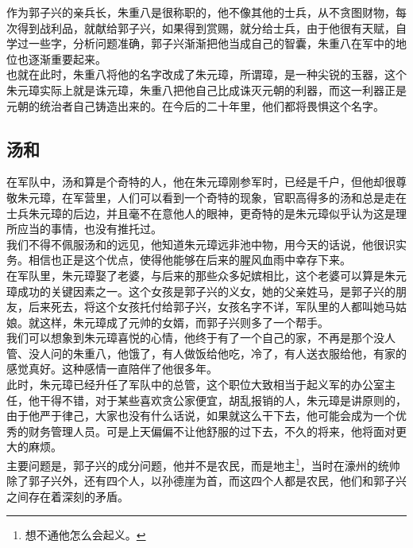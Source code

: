 \begin{multicols}{\theparacolNo}
作为郭子兴的亲兵长，朱重八是很称职的，他不像其他的士兵，从不贪图财物，每次得到战利品，就献给郭子兴，如果得到赏赐，就分给士兵，由于他很有天赋，自学过一些字，分析问题准确，郭子兴渐渐把他当成自己的智囊，朱重八在军中的地位也逐渐重要起来。\\

也就在此时，朱重八将他的名字改成了朱元璋，所谓璋，是一种尖锐的玉器，这个朱元璋实际上就是诛元璋，朱重八把他自己比成诛灭元朝的利器，而这一利器正是元朝的统治者自己铸造出来的。在今后的二十年里，他们都将畏惧这个名字。\\

\subsection{汤和}
在军队中，汤和算是个奇特的人，他在朱元璋刚参军时，已经是千户，但他却很尊敬朱元璋，在军营里，人们可以看到一个奇特的现象，官职高得多的汤和总是走在士兵朱元璋的后边，并且毫不在意他人的眼神，更奇特的是朱元璋似乎认为这是理所应当的事情，也没有推托过。\\

我们不得不佩服汤和的远见，他知道朱元璋远非池中物，用今天的话说，他很识实务。相信也正是这个优点，使得他能够在后来的腥风血雨中幸存下来。\\

在军队里，朱元璋娶了老婆，与后来的那些众多妃嫔相比，这个老婆可以算是朱元璋成功的关键因素之一。这个女孩是郭子兴的义女，她的父亲姓马，是郭子兴的朋友，后来死去，将这个女孩托付给郭子兴，女孩名字不详，军队里的人都叫她马姑娘。就这样，朱元璋成了元帅的女婿，而郭子兴则多了一个帮手。\\

我们可以想象到朱元璋喜悦的心情，他终于有了一个自己的家，不再是那个没人管、没人问的朱重八，他饿了，有人做饭给他吃，冷了，有人送衣服给他，有家的感觉真好。这种感情一直陪伴了他很多年。\\

此时，朱元璋已经升任了军队中的总管，这个职位大致相当于起义军的办公室主任，他干得不错，对于某些喜欢贪公家便宜，胡乱报销的人，朱元璋是讲原则的，由于他严于律己，大家也没有什么话说，如果就这么干下去，他可能会成为一个优秀的财务管理人员。可是上天偏偏不让他舒服的过下去，不久的将来，他将面对更大的麻烦。\\

主要问题是，郭子兴的成分问题，他并不是农民，而是地主\footnote{想不通他怎么会起义。}，当时在濠州的统帅除了郭子兴外，还有四个人，以孙德崖为首，而这四个人都是农民，他们和郭子兴之间存在着深刻的矛盾。\\


\end{multicols}
